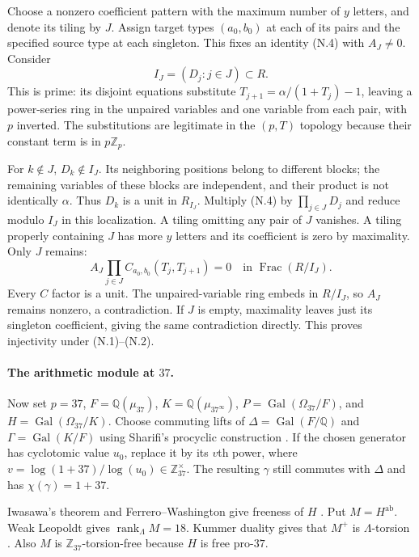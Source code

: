 \documentclass[11pt,a4paper]{article}
\theoremstyle{definition}
\begin{document}
Choose a nonzero coefficient pattern with the maximum number of $y$ letters, and denote its tiling by $J$. Assign target types $(a_0,b_0)$ at each of its pairs and the specified source type at each singleton. This fixes an identity (N.4) with $A_J\ne0$. Consider
\[
 I_J=(D_j:j\in J)\subset R.
\]
This is prime: its disjoint equations substitute $T_{j+1}=\alpha/(1+T_j)-1$, leaving a power-series ring in the unpaired variables and one variable from each pair, with $p$ inverted. The substitutions are legitimate in the $(p,T)$ topology because their constant term is in $p\mathbb Z_p$.

For $k\notin J$, $D_k\notin I_J$. Its neighboring positions belong to different blocks; the remaining variables of these blocks are independent, and their product is not identically $\alpha$. Thus $D_k$ is a unit in $R_{I_J}$. Multiply (N.4) by $\prod_{j\in J}D_j$ and reduce modulo $I_J$ in this localization. A tiling omitting any pair of $J$ vanishes. A tiling properly containing $J$ has more $y$ letters and its coefficient is zero by maximality. Only $J$ remains:
\[
 A_J\prod_{j\in J}C_{a_0,b_0}(T_j,T_{j+1})=0
 \quad\text{in }\operatorname{Frac}(R/I_J).
\]
Every $C$ factor is a unit. The unpaired-variable ring embeds in $R/I_J$, so $A_J$ remains nonzero, a contradiction. If $J$ is empty, maximality leaves just its singleton coefficient, giving the same contradiction directly. This proves injectivity under (N.1)--(N.2).

\paragraph{The arithmetic module at $37$.}
Now set $p=37$, $F=\mathbb Q(\mu_{37})$, $K=\mathbb Q(\mu_{37^\infty})$, $P=\operatorname{Gal}(\Omega_{37}/F)$, and $H=\operatorname{Gal}(\Omega_{37}/K)$. Choose commuting lifts of $\Delta=\operatorname{Gal}(F/\mathbb Q)$ and $\Gamma=\operatorname{Gal}(K/F)$ using Sharifi's procyclic construction \cite[\S2, p.~3]{Sharifi2002}. If the chosen generator has cyclotomic value $u_0$, replace it by its $v$th power, where $v=\log(1+37)/\log(u_0)\in\mathbb Z_{37}^{\times}$. The resulting $\gamma$ still commutes with $\Delta$ and has $\chi(\gamma)=1+37$.

Iwasawa's theorem and Ferrero--Washington give freeness of $H$ \cite[Theorem~2, pp.~273--274]{Iwasawa1981}. Put $M=H^{\mathrm{ab}}$. Weak Leopoldt gives $\operatorname{rank}_{\Lambda}M=18$. Kummer duality gives that $M^+$ is $\Lambda$-torsion \cite[Theorems~3.3.3--3.3.4, Proposition~3.4.7]{SharifiIwasawaNotes}. Also $M$ is $\mathbb Z_{37}$-torsion-free because $H$ is free pro-$37$.
\end{document}
